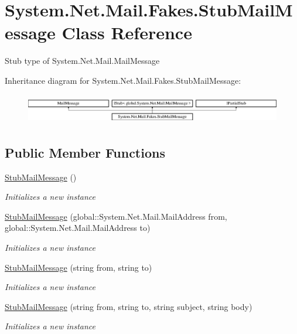 \hypertarget{class_system_1_1_net_1_1_mail_1_1_fakes_1_1_stub_mail_message}{\section{System.\-Net.\-Mail.\-Fakes.\-Stub\-Mail\-Message Class Reference}
\label{class_system_1_1_net_1_1_mail_1_1_fakes_1_1_stub_mail_message}
}


Stub type of System.\-Net.\-Mail.\-Mail\-Message 


Inheritance diagram for System.\-Net.\-Mail.\-Fakes.\-Stub\-Mail\-Message\-:\begin{figure}[H]
\begin{center}
\leavevmode
\includegraphics[height=1.333333cm]{class_system_1_1_net_1_1_mail_1_1_fakes_1_1_stub_mail_message}
\end{center}
\end{figure}
\subsection*{Public Member Functions}
\begin{DoxyCompactItemize}
\item 
\hyperlink{class_system_1_1_net_1_1_mail_1_1_fakes_1_1_stub_mail_message_adb23a57156e63c4ea65102dd31b3c689}{Stub\-Mail\-Message} ()
\begin{DoxyCompactList}\small\item\em Initializes a new instance\end{DoxyCompactList}\item 
\hyperlink{class_system_1_1_net_1_1_mail_1_1_fakes_1_1_stub_mail_message_aaadf8978e17ca4632f970f116a359156}{Stub\-Mail\-Message} (global\-::\-System.\-Net.\-Mail.\-Mail\-Address from, global\-::\-System.\-Net.\-Mail.\-Mail\-Address to)
\begin{DoxyCompactList}\small\item\em Initializes a new instance\end{DoxyCompactList}\item 
\hyperlink{class_system_1_1_net_1_1_mail_1_1_fakes_1_1_stub_mail_message_a69972e2a3e7fa5856728a4023691b23b}{Stub\-Mail\-Message} (string from, string to)
\begin{DoxyCompactList}\small\item\em Initializes a new instance\end{DoxyCompactList}\item 
\hyperlink{class_system_1_1_net_1_1_mail_1_1_fakes_1_1_stub_mail_message_ab5a8f0340f98d2c23e3edb20d18b668c}{Stub\-Mail\-Message} (string from, string to, string subject, string body)
\begin{DoxyCompactList}\small\item\em Initializes a new instance\end{DoxyCompactList}\end{DoxyCompactItemize}
